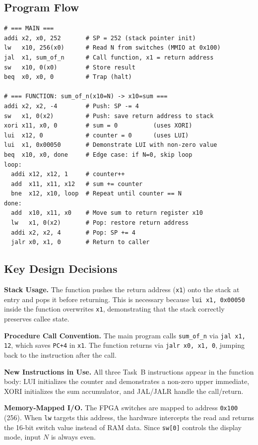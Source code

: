 \documentclass[11pt,a4paper]{article}
\begin{document}
\subsection{Program Flow}

\begin{lstlisting}[style=asm]
# === MAIN ===
addi x2, x0, 252       # SP = 252 (stack pointer init)
lw   x10, 256(x0)      # Read N from switches (MMIO at 0x100)
jal  x1, sum_of_n      # Call function, x1 = return address
sw   x10, 0(x0)        # Store result
beq  x0, x0, 0         # Trap (halt)

# === FUNCTION: sum_of_n(x10=N) -> x10=sum ===
addi x2, x2, -4        # Push: SP -= 4
sw   x1, 0(x2)         # Push: save return address to stack
xori x11, x0, 0        # sum = 0          (uses XORI)
lui  x12, 0            # counter = 0      (uses LUI)
lui  x1, 0x00050       # Demonstrate LUI with non-zero value
beq  x10, x0, done     # Edge case: if N=0, skip loop
loop:
  addi x12, x12, 1     # counter++
  add  x11, x11, x12   # sum += counter
  bne  x12, x10, loop  # Repeat until counter == N
done:
  add  x10, x11, x0    # Move sum to return register x10
  lw   x1, 0(x2)       # Pop: restore return address
  addi x2, x2, 4       # Pop: SP += 4
  jalr x0, x1, 0       # Return to caller
\end{lstlisting}

\subsection{Key Design Decisions}

\textbf{Stack Usage.} The function pushes the return address (\texttt{x1}) onto the stack at entry and pops it before returning. This is necessary because \texttt{lui x1, 0x00050} inside the function overwrites \texttt{x1}, demonstrating that the stack correctly preserves callee state.

\textbf{Procedure Call Convention.} The main program calls \texttt{sum\_of\_n} via \texttt{jal x1, 12}, which saves \texttt{PC+4} in \texttt{x1}. The function returns via \texttt{jalr x0, x1, 0}, jumping back to the instruction after the call.

\textbf{New Instructions in Use.} All three Task~B instructions appear in the function body: LUI initializes the counter and demonstrates a non-zero upper immediate, XORI initializes the sum accumulator, and JAL/JALR handle the call/return.

\textbf{Memory-Mapped I/O.} The FPGA switches are mapped to address \texttt{0x100} (256). When \texttt{lw} targets this address, the hardware intercepts the read and returns the 16-bit switch value instead of RAM data. Since \texttt{sw[0]} controls the display mode, input $N$ is always even.
\end{document}
